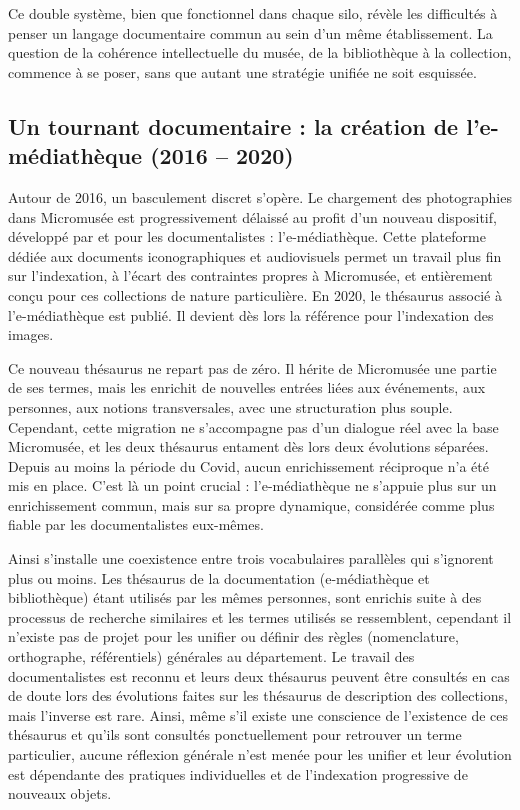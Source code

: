 Ce double système, bien que fonctionnel dans chaque silo, révèle les difficultés à penser un langage documentaire commun au sein d’un même établissement. La question de la cohérence intellectuelle du musée, de la bibliothèque à la collection, commence à se poser, sans que autant une stratégie unifiée ne soit esquissée.

\subsection{Un tournant documentaire : la création de l’e-médiathèque (2016 – 2020)}

Autour de 2016, un basculement discret s’opère. Le chargement des photographies dans Micromusée est progressivement délaissé au profit d’un nouveau dispositif, développé par et pour les documentalistes : l’e-médiathèque. Cette plateforme dédiée aux documents iconographiques et audiovisuels permet un travail plus fin sur l’indexation, à l’écart des contraintes propres à Micromusée, et entièrement conçu pour ces collections de nature particulière. En 2020, le thésaurus associé à l’e-médiathèque est publié. Il devient dès lors la référence pour l’indexation des images.

Ce nouveau thésaurus ne repart pas de zéro. Il hérite de Micromusée une partie de ses termes, mais les enrichit de nouvelles entrées liées aux événements, aux personnes, aux notions transversales, avec une structuration plus souple. Cependant, cette migration ne s’accompagne pas d’un dialogue réel avec la base Micromusée, et les deux thésaurus entament dès lors deux évolutions séparées. Depuis au moins la période du Covid, aucun enrichissement réciproque n’a été mis en place. C’est là un point crucial : l’e-médiathèque ne s’appuie plus sur un enrichissement commun, mais sur sa propre dynamique, considérée comme plus fiable par les documentalistes eux-mêmes.

Ainsi s'installe une coexistence entre trois vocabulaires parallèles qui s'ignorent plus ou moins. Les thésaurus de la documentation (e-médiathèque et bibliothèque) étant utilisés par les mêmes personnes, sont enrichis suite à des processus de recherche similaires et les termes utilisés se ressemblent, cependant il n'existe pas de projet pour les unifier ou définir des règles (nomenclature, orthographe, référentiels) générales au département. Le travail des documentalistes est reconnu et leurs deux thésaurus peuvent être consultés en cas de doute lors des évolutions faites sur les thésaurus de description des collections, mais l'inverse est rare. Ainsi, même s'il existe une conscience de l'existence de ces thésaurus et qu'ils sont consultés ponctuellement pour retrouver un terme particulier, aucune réflexion générale n'est menée pour les unifier et leur évolution est dépendante des pratiques individuelles et de l'indexation progressive de nouveaux objets.


